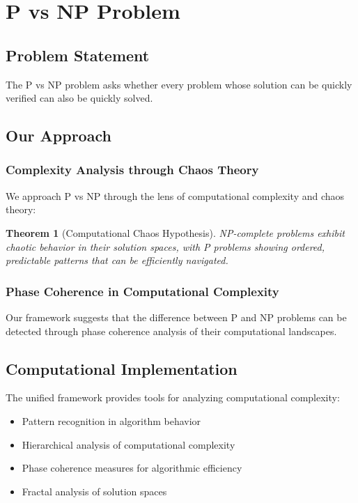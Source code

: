 \documentclass[12pt]{article}
\newtheorem{theorem}{Theorem}
\begin{document}
\section{P vs NP Problem}

\subsection{Problem Statement}
The P vs NP problem asks whether every problem whose solution can be quickly verified can also be quickly solved.

\subsection{Our Approach}

\subsubsection{Complexity Analysis through Chaos Theory}

We approach P vs NP through the lens of computational complexity and chaos theory:

\begin{theorem}[Computational Chaos Hypothesis]
NP-complete problems exhibit chaotic behavior in their solution spaces, with P problems showing ordered, predictable patterns that can be efficiently navigated.
\end{theorem}

\subsubsection{Phase Coherence in Computational Complexity}

Our framework suggests that the difference between P and NP problems can be detected through phase coherence analysis of their computational landscapes.

\subsection{Computational Implementation}

The unified framework provides tools for analyzing computational complexity:
\begin{itemize}
    \item Pattern recognition in algorithm behavior
    \item Hierarchical analysis of computational complexity
    \item Phase coherence measures for algorithmic efficiency
    \item Fractal analysis of solution spaces
\end{itemize}
\end{document}
